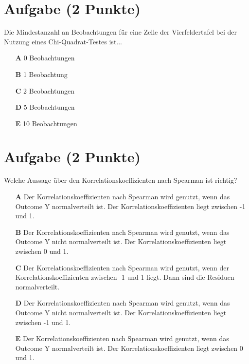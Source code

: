 \documentclass[a4paper, 9pt]{scrartcl}\usepackage[]{graphicx}\usepackage[]{xcolor}
\begin{document}
\section{Aufgabe \hfill (2 Punkte)}

Die Mindestanzahl an Beobachtungen f{\"u}r eine Zelle der Vierfeldertafel bei
der Nutzung eines Chi-Quadrat-Testes ist...



\begin{enumerate}
\item [\textbf{A} \msquare] 0 Beobachtungen
\item [\textbf{B} \msquare] 1 Beobachtung
\item [\textbf{C} \msquare] 2 Beobachtungen
\item [\textbf{D} \msquare] 5 Beobachtungen
\item [\textbf{E} \msquare] 10 Beobachtungen
\end{enumerate} 

\section{Aufgabe \hfill (2 Punkte)}




Welche Aussage {\"u}ber den Korrelationskoeffizienten nach Spearman
ist richtig?



\begin{enumerate}
\item [\textbf{A} \msquare] Der Korrelationskoeffizienten nach Spearman wird genutzt, wenn das Outcome Y normalverteilt ist. Der Korrelationskoeffizienten liegt zwischen -1 und 1.
\item [\textbf{B} \msquare] Der Korrelationskoeffizienten nach Spearman wird genutzt, wenn das Outcome Y nicht normalverteilt ist. Der Korrelationskoeffizienten liegt zwischen 0 und 1.
\item [\textbf{C} \msquare] Der Korrelationskoeffizienten nach Spearman wird genutzt, wenn der Korrelationskoeffizienten zwischen -1 und 1 liegt. Dann sind die Residuen normalverteilt.
\item [\textbf{D} \msquare] Der Korrelationskoeffizienten nach Spearman wird genutzt, wenn das Outcome Y nicht normalverteilt ist. Der Korrelationskoeffizienten liegt zwischen -1 und 1.
\item [\textbf{E} \msquare] Der Korrelationskoeffizienten nach Spearman wird genutzt, wenn das Outcome Y normalverteilt ist. Der Korrelationskoeffizienten liegt zwischen 0 und 1.
\end{enumerate} 
\end{document}
